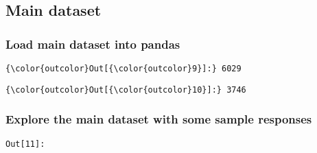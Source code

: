 \documentclass[11pt]{article}
\begin{document}
\subsection{Main dataset}\label{main-dataset}

    \subsubsection{Load main dataset into
pandas}\label{load-main-dataset-into-pandas}




            \begin{Verbatim}[commandchars=\\\{\}]
{\color{outcolor}Out[{\color{outcolor}9}]:} 6029
\end{Verbatim}
        

            \begin{Verbatim}[commandchars=\\\{\}]
{\color{outcolor}Out[{\color{outcolor}10}]:} 3746
\end{Verbatim}
        
    \subsubsection{Explore the main dataset with some sample
responses}\label{explore-the-main-dataset-with-some-sample-responses}

\texttt{\color{outcolor}Out[{\color{outcolor}11}]:}
    
\end{document}
